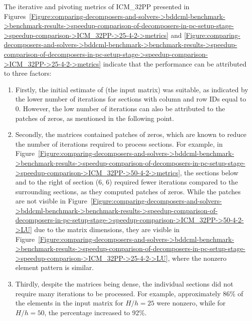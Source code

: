 The iterative and pivoting metrics of ICM\_32PP presented in Figures~\ref{Figure:comparing-decomposers-and-solvers->bddcml-benchmark->benchmark-results->speedup-comparison-of-decomposers-in-pc-setup-stage->speedup-comparison->ICM_32PP->25-4-2->metrics} and \ref{Figure:comparing-decomposers-and-solvers->bddcml-benchmark->benchmark-results->speedup-comparison-of-decomposers-in-pc-setup-stage->speedup-comparison->ICM_32PP->25-4-2->metrics} indicate that the performance can be attributed to three factors:

\begin{enumerate}
	\item Firstly, the initial estimate of  (the input matrix) was suitable, as indicated by the lower number of iterations for sections with column and row IDs equal to 0. However, the low number of iterations can also be attributed to the patches of zeros, as mentioned in the following point.
	\item Secondly, the matrices contained patches of zeros, which are known to reduce the number of iterations required to process sections. For example, in Figure~\ref{Figure:comparing-decomposers-and-solvers->bddcml-benchmark->benchmark-results->speedup-comparison-of-decomposers-in-pc-setup-stage->speedup-comparison->ICM_32PP->50-4-2->metrics}, the sections below and to the right of section (6, 6) required fewer iterations compared to the surrounding sections, as they computed patches of zeros. While the patches are not visible in Figure~\ref{Figure:comparing-decomposers-and-solvers->bddcml-benchmark->benchmark-results->speedup-comparison-of-decomposers-in-pc-setup-stage->speedup-comparison->ICM_32PP->50-4-2->LU} due to the matrix dimensions, they are visible in Figure~\ref{Figure:comparing-decomposers-and-solvers->bddcml-benchmark->benchmark-results->speedup-comparison-of-decomposers-in-pc-setup-stage->speedup-comparison->ICM_32PP->25-4-2->LU}, where the nonzero element pattern is similar.
	\item Thirdly, despite the matrices being dense, the individual sections did not require many iterations to be processed. For example, approximately 86\% of the elements in the input matrix for $H/h = 25$ were nonzero, while for $H/h = 50$, the percentage increased to 92\%.
\end{enumerate}

